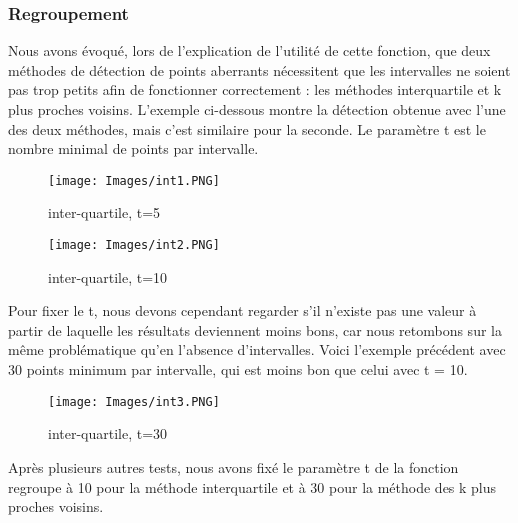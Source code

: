 \documentclass[a4paper,12pt]{article} %
\begin{document}
            
            \subsubsection{Regroupement}
            
            
                 Nous avons évoqué, lors de l'explication de l'utilité de cette fonction, que deux méthodes de détection de points aberrants nécessitent que les intervalles ne soient pas trop petits afin de fonctionner correctement : les méthodes interquartile et k plus proches voisins. L'exemple ci-dessous montre la détection obtenue avec l'une des deux méthodes, mais c'est similaire pour la seconde. Le paramètre t est le nombre minimal de points par intervalle.
                 \begin{figure}[H] %
                \texttt{[image: Images/int1.PNG]} %
                \caption{inter-quartile, t=5} %
                \label{m15} %
                \endminipage
                \texttt{[image: Images/int2.PNG]}  
                \caption{inter-quartile, t=10}
                \label{m5}
                \endminipage
                \end{figure}
                Pour fixer le t, nous devons cependant regarder s'il n'existe pas une valeur à partir de laquelle les résultats deviennent moins bons, car nous retombons sur la même problématique qu'en l'absence d'intervalles. Voici l'exemple précédent avec 30 points minimum par intervalle, qui est moins bon que celui avec t = 10.
                \begin{figure}[H]
                    \centering
                 \texttt{[image: Images/int3.PNG]} %
                \caption{inter-quartile, t=30} 
                \end{figure}
                
                Après plusieurs autres tests, nous avons fixé le paramètre t de la fonction regroupe à 10 pour la méthode interquartile et à 30 pour la méthode des k plus proches voisins.
        
\end{document}
